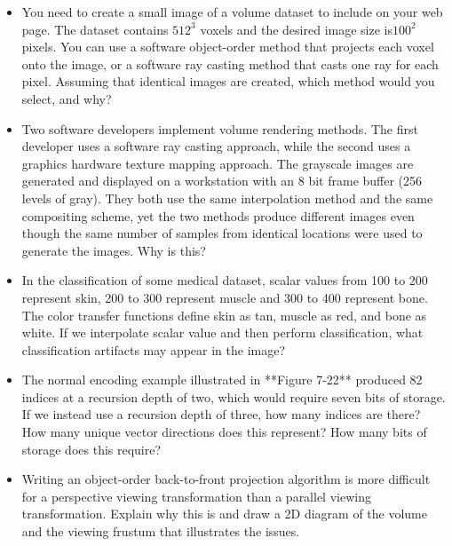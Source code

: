 \begin{itemize}
\item You need to create a small image of a volume dataset to include on your web page. The dataset contains $512^3$ voxels and the desired image size is$100^2$ pixels. You can use a software object-order method that projects each voxel onto the image, or a software ray casting method that casts one ray for each pixel. Assuming that identical images are created, which method would you select, and why?

\item Two software developers implement volume rendering methods. The first developer uses a software ray casting approach, while the second uses a graphics hardware texture mapping approach. The grayscale images are generated and displayed on a workstation with an 8 bit frame buffer (256 levels of gray). They both use the same interpolation method and the same compositing scheme, yet the two methods produce different images even though the same number of samples from identical locations were used to generate the images. Why is this?

\item In the classification of some medical dataset, scalar values from 100 to 200 represent skin, 200 to 300 represent muscle and 300 to 400 represent bone. The color transfer functions define skin as tan, muscle as red, and bone as white. If we interpolate scalar value and then perform classification, what classification artifacts may appear in the image?

\item The normal encoding example illustrated in **Figure 7-22** produced 82 indices at a recursion depth of two, which would require seven bits of storage. If we instead use a recursion depth of three, how many indices are there? How many unique vector directions does this represent? How many bits of storage does this require?

\item Writing an object-order back-to-front projection algorithm is more difficult for a perspective viewing transformation than a parallel viewing transformation. Explain why this is and draw a 2D diagram of the volume and the viewing frustum that illustrates the issues.

\end{itemize}
